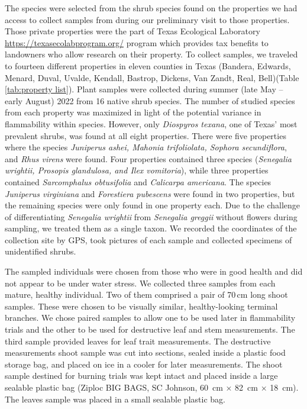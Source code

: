 \documentclass{ttuthes2007}
\begin{document}
\noindent The species were selected from the shrub species found on the properties we had access to collect samples from during our preliminary visit to those properties. Those private properties were the part of Texas Ecological Laboratory  \url{https://texasecolabprogram.org/} program which provides tax benefits to landowners who allow research on their property.  To collect samples, we traveled to fourteen different properties in eleven counties in Texas (Bandera, Edwards, Menard, Duval, Uvalde, Kendall, Bastrop, Dickens, Van Zandt, Real, Bell)(Table \ref{tab:property list}).   %
Plant samples were collected during summer (late May -- early August) 2022 from 16 native shrub species. The number of studied species from each property was maximized in light of the potential variance in flammability within species. However, only \emph{Diospyros texana}, one of Texas' most prevalent shrubs, was found at all eight properties. There were five properties where the species \emph{Juniperus ashei, Mahonia trifoliolata, Sophora secundiflora}, and \emph{Rhus virens} were found. Four properties contained three species (\emph{Senegalia wrightii, Prosopis glandulosa, and Ilex vomitoria}), while three properties contained \emph{Sarcomphalus obtusifolia} \citep{hauenschild2016phylogenetic} and \emph{Calicarpa americana}. The species \emph{Juniperus virginiana} and \emph{Forestiera pubescens} were found in two properties, but the remaining species were only found in one property each. %
\noindent Due to the challenge of differentiating \emph{Senegalia wrightii} from \emph{Senegalia greggii} without flowers during sampling, we treated them as a single taxon. We recorded the coordinates of the collection site by GPS, took pictures of each sample  and collected specimens of unidentified shrubs.



\noindent The sampled individuals were chosen from those who were in good health and did not appear to be under water stress. We collected three samples from each mature, healthy individual. Two of them comprised a pair of 70\,cm long shoot samples. These were chosen to be visually similar, healthy-looking terminal branches. We chose paired samples to allow one to be used later in flammability trials and the other to be used for destructive leaf and stem measurements. The third sample provided leaves for leaf trait measurements. %
The destructive measurements shoot sample was cut into sections, sealed inside a plastic food storage bag, and placed on ice in a cooler for later measurements. The shoot sample destined for burning trials was kept intact and placed inside a large sealable plastic bag (Ziploc BIG BAGS, SC Johnson, 60 \,cm × 82 \,cm × 18 \,cm). The leaves sample was placed in a small sealable plastic bag.
\end{document}
